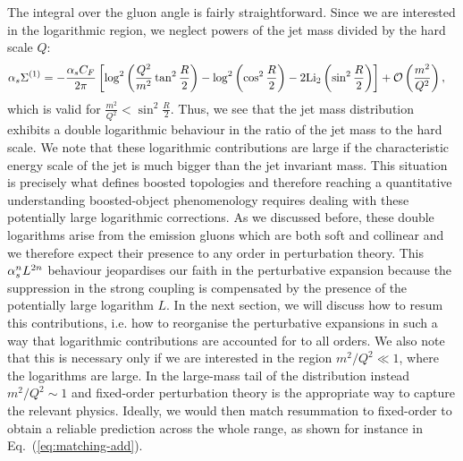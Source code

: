 The integral over the gluon angle is fairly straightforward. Since we
are interested in the logarithmic region, we neglect powers of the jet
mass divided by the hard scale $Q$:
\begin{align}\label{eq:sigma-1-loop-cntd}
\alpha_s \Sigma^{(1)}&=- \frac{\alpha_s C_F}{2 \pi} 
\left[\log^2 \left( \frac{Q^2}{m^2}\tan^2 \frac{R}{2} \right) -\log^2 \left(\cos^2 \frac{R}{2}\right)- 2 \text{Li}_2\left(\sin^2\frac{R}{2} \right) \right] +\mathcal{O} \left(\frac{m^2}{Q^2} \right),
\end{align}
which is valid for $\frac{m^2}{Q^2}< \sin^2\frac{R}{2}$.
Thus, we see that the jet mass distribution exhibits a double
logarithmic behaviour in the ratio of the jet mass to the hard
scale. 
%
We note that these logarithmic contributions are large if the characteristic energy scale of the jet is much bigger than the jet invariant mass.
This situation is precisely what defines boosted topologies and therefore reaching a quantitative understanding boosted-object phenomenology requires dealing with these potentially large logarithmic corrections.
%
As we discussed before, these double logarithms arise from the
emission gluons which are both soft and collinear and we therefore
expect their presence to any order in perturbation theory. This $\alpha_s^n
L^{2n}$ behaviour jeopardises our faith in the perturbative expansion
because the suppression in the strong coupling is compensated by the
presence of the potentially large logarithm $L$. In the next section,
we will discuss how to resum this contributions, i.e. how to
reorganise the perturbative expansions in such a way that logarithmic
contributions are accounted for to all orders. We also note that this
is necessary only if we are interested in the region $m^2/Q^2\ll1$,
where the logarithms are large. In the large-mass tail of the distribution instead $m^2/Q^2\sim 1$ and fixed-order perturbation theory is the appropriate way to capture the relevant physics. Ideally, we would then match resummation to fixed-order to obtain a reliable prediction across the whole range, as shown for instance in Eq.~(\ref{eq:matching-add}).
%

